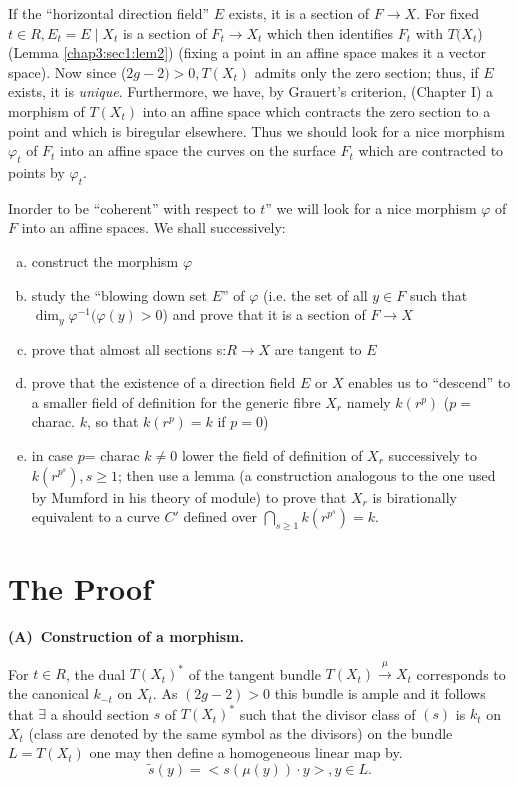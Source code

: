 \medskip
If the ``horizontal direction field'' $E$ exists, it is a section of
$F\rightarrow X$. For fixed $t \in   R, E_t=E \mid X_t$ is a  section
of $F_t\rightarrow X_t$ which then identifies  $F_t$ with
$T(X_{t}$)(Lemma \ref{chap3:sec1:lem2}) (fixing a  point in an affine  space makes it a
vector space). Now since ($2g-2)>0, T(X_t)$ admits only the zero
section; thus, if $E$ exists,  it is \textit{unique}. Furthermore, we
have, by Grauert's criterion, (Chapter I) a morphism of $T(X_t)$
into an affine space which contracts the zero section to a point and which
is biregular elsewhere. Thus we should look for a nice morphism $\varphi
_t$ of $F_t$ into an affine space the curves on the surface $F_t$
which are contracted to points by $\varphi_t$.    

In\pageoriginale order to be ``coherent'' with respect to $t$''  we will look for a
nice morphism $\varphi$ of $F$ into an affine spaces. We shall
successively: 
\begin{enumerate}[a)]
\item construct the morphism $\varphi$
\item study the ``blowing down set $E$'' of $\varphi$ (i.e. the set of
  all $y  \in   F$ such that $\dim_y \varphi^{-1}(\varphi(y)>0$)  and
  prove that it is a section of $F \rightarrow X$ 
\item prove that almost all  sections s:$R\rightarrow X$ are tangent to $E$
\item prove that the existence of a direction field $E$ or $X$ enables
  us to ``descend'' to a smaller field of definition for the generic
  fibre $X_r$ namely $k(r^p)$ ($p=$ charac. $k$, so that $k(r^p)=k$ if
  $p=0$) 
\item in case $p$= charac $k\neq 0$ lower the field of definition  of
  $X_r$ successively to $k(r^{p^s}), s\ge   1$; then use a lemma (a
  construction analogous  to the one used by Mumford in his theory of
  module) to prove that $X_r$ is birationally equivalent to a curve
  $C'$ defined over $\bigcap\limits_{s\ge 1}k(r^{p^s})=k$. 
\end{enumerate}


\section{The Proof}\label{chap3:sec2}

\noindent
\textbf{(A)~Construction of a morphism.}

For $t \in R$, the dual $T(X_t)^\ast$ of the tangent bundle $T(X_t)
\xrightarrow{\mu}X_t$ corresponds to the canonical $k_{-t}$ on
$X_t$. As $(2g-2)>0$ this bundle is ample and it follows that
$\exists$ a should section  $s$ of $T(X_t)^*$ such that the divisor
class of $(s)$ is $k_t$ on $X_t$ (class are denoted  by the same symbol
as the divisors) on the bundle $L=T(X_t)$ one may then define a homogeneous
linear map by. 
$$
\tilde{s}(y)=\big<s(\mu (y))\cdot y\big>, y \in   L.
$$

